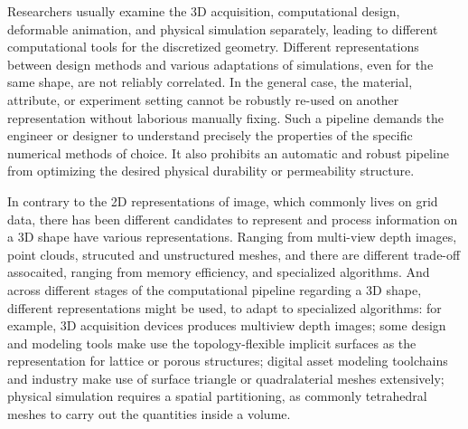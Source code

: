 Researchers usually examine the 3D acquisition, computational design, deformable animation, and physical simulation separately, leading to different computational tools for the discretized geometry. Different representations between design methods and various adaptations of simulations, even for the same shape, are not reliably correlated. In the general case, the material, attribute, or experiment setting cannot be robustly re-used on another representation without laborious manually fixing. Such a pipeline demands the engineer or designer to understand precisely the properties of the specific numerical methods of choice. It also prohibits an automatic and robust pipeline from optimizing the desired physical durability or permeability structure.

In contrary to the 2D representations of image, which commonly lives on grid data, there has been different candidates to represent and process information on a 3D shape have various representations. Ranging from multi-view depth images, point clouds, strucuted and unstructured meshes, and  there are different trade-off assocaited, ranging from memory efficiency, and specialized algorithms. And across different stages of the computational pipeline regarding a 3D shape, different representations might be used, to adapt to specialized algorithms: for example, 3D acquisition devices produces multiview depth images; some design and modeling tools make use the topology-flexible implicit surfaces as the representation for lattice or porous structures; digital asset modeling toolchains and industry make use of surface triangle or quadralaterial meshes extensively; physical simulation requires a spatial partitioning, as commonly tetrahedral meshes to carry out the quantities inside a volume. 

